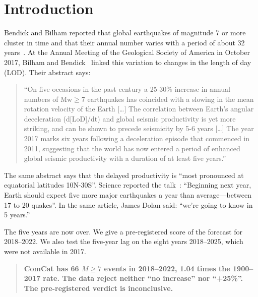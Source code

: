 \documentclass[11pt]{article}
\begin{document}
\section{Introduction}
Bendick and Bilham reported that global earthquakes of magnitude 7 or more cluster in time and that their annual number varies with a period of about 32 years~\cite{bb2017,voosen2017}. At the Annual Meeting of the Geological Society of America in October 2017, Bilham and Bendick~\cite{gsa2017} linked this variation to changes in the length of day (LOD). Their abstract says:
\begin{quote}
``On five occasions in the past century a 25-30\% increase in annual numbers of Mw$\ge$7 earthquakes has coincided with a slowing in the mean rotation velocity of the Earth [\dots] The correlation between Earth's angular deceleration (d[LoD]/dt) and global seismic productivity is yet more striking, and can be shown to precede seismicity by 5-6 years [\dots] The year 2017 marks six years following a deceleration episode that commenced in 2011, suggesting that the world has now entered a period of enhanced global seismic productivity with a duration of at least five years.''
\end{quote}
The same abstract says that the delayed productivity is ``most pronounced at equatorial latitudes 10\textdegree N-30\textdegree S''. Science reported the talk~\cite{voosen2017}: ``Beginning next year, Earth should expect five more major earthquakes a year than average---between 17 to 20 quakes''. In the same article, James Dolan said: ``we're going to know in 5 years.''

The five years are now over. We give a pre-registered score of the forecast for 2018--2022. We also test the five-year lag on the eight years 2018--2025, which were not available in 2017.

\begin{quote}
\textbf{ComCat has 66 $M\ge7$ events in 2018--2022, 1.04 times the 1900--2017 rate. The data reject neither ``no increase'' nor ``+25\%''. The pre-registered verdict is inconclusive.}
\end{quote}
\end{document}
